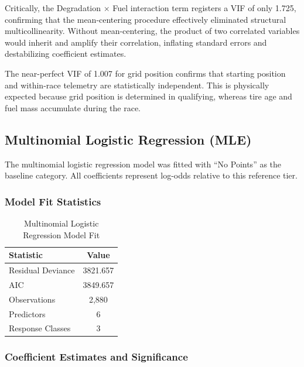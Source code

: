 Critically, the Degradation $\times$ Fuel interaction term registers a VIF
of only 1.725, confirming that the mean-centering procedure effectively
eliminated structural multicollinearity. Without mean-centering, the product
of two correlated variables would inherit and amplify their correlation,
inflating standard errors and destabilizing coefficient estimates.

The near-perfect VIF of 1.007 for grid position confirms that starting
position and within-race telemetry are statistically independent. This is
physically expected because grid position is determined in qualifying,
whereas tire age and fuel mass accumulate during the race.

\subsection{Multinomial Logistic Regression (MLE)}

The multinomial logistic regression model was fitted with ``No Points'' as the
baseline category. All coefficients represent log-odds relative to this
reference tier.

\subsubsection{Model Fit Statistics}

\begin{table}[htbp]
  \centering
  \caption{Multinomial Logistic Regression Model Fit}
  \label{tab:model-fit}
  \begin{tabular}{lc}
    \toprule
    \textbf{Statistic} & \textbf{Value} \\
    \midrule
    Residual Deviance & 3821.657 \\
    AIC               & 3849.657 \\
    Observations      & 2,880 \\
    Predictors        & 6 \\
    Response Classes  & 3 \\
    \bottomrule
  \end{tabular}
\end{table}

\subsubsection{Coefficient Estimates and Significance}

